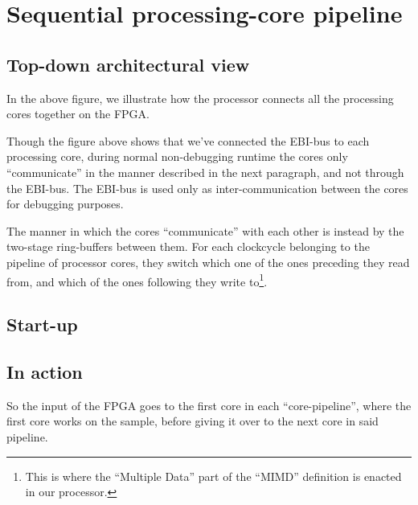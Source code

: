 \FloatBarrier
\section{Sequential processing-core pipeline}\label{section:sequential-pipeline}

\FloatBarrier
\subsection{Top-down architectural view}


In the above figure,  we
illustrate how the processor connects all the processing cores together on the
FPGA.

Though the  figure above shows
that we've connected the  EBI-bus to each
processing core, during normal non-debugging runtime the cores only
``communicate'' in the manner described in the next paragraph, and not through
the EBI-bus. The EBI-bus is used only as inter-communication between the cores
for debugging purposes.

The manner in which the cores ``communicate'' with each other is instead by the
two-stage ring-buffers between them. For each clockcycle belonging to the
pipeline of processor cores, they switch which one of the ones preceding they
read from, and which of the ones following they write to\footnote{This is where
the ``Multiple Data'' part of the ``MIMD'' definition is enacted
in our processor.}.

\FloatBarrier
\subsection{Start-up}



\FloatBarrier
\subsection{In action}

So the input of the FPGA goes to the first core in each ``core-pipeline'', where
the first core works on the sample, before giving it over to the next core in
said pipeline.
